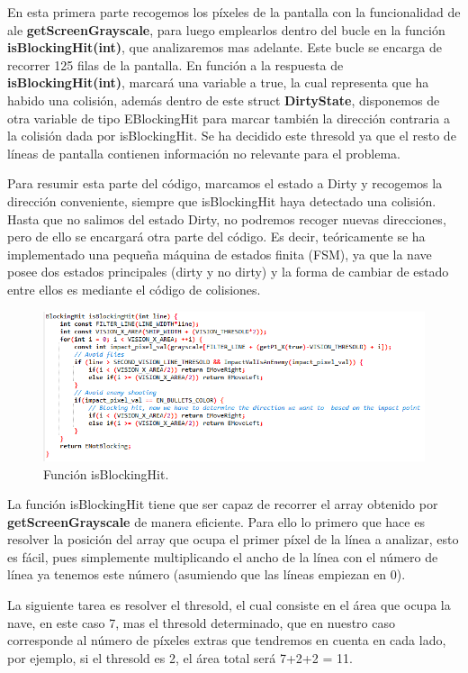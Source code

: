 En esta primera parte recogemos los píxeles de la pantalla con la funcionalidad de \ac{ale} \textbf{getScreenGrayscale}, para luego emplearlos dentro del bucle en la función \textbf{isBlockingHit(int)}, que analizaremos mas adelante. Este bucle se encarga de recorrer 125 filas de la pantalla. En función a la respuesta de \textbf{isBlockingHit(int)}, marcará una variable a true, la cual representa que ha habido una colisión, además dentro de este struct \textbf{DirtyState}, disponemos de otra variable de tipo EBlockingHit para marcar también la dirección contraria a la colisión dada por isBlockingHit. Se ha decidido este thresold ya que el resto de líneas de pantalla contienen información no relevante para el problema.

Para resumir esta parte del código, marcamos el estado a Dirty y recogemos la dirección conveniente, siempre que isBlockingHit haya detectado una colisión. Hasta que no salimos del estado Dirty, no podremos recoger nuevas direcciones, pero de ello se encargará otra parte del código. Es decir, teóricamente se ha implementado una pequeña máquina de estados finita (FSM), ya que la nave posee dos estados principales (dirty y no dirty) y la forma de cambiar de estado entre ellos es mediante el código de colisiones.

\newpage
\begin{figure}[h]
	\centering
	\includegraphics[width=1\textwidth]{Figures/daisblocking}
	\caption{Función isBlockingHit.}
	\label{fig:daisblocking}
\end{figure}

La función isBlockingHit tiene que ser capaz de recorrer el array obtenido por \textbf{getScreenGrayscale} de manera eficiente. Para ello lo primero que hace es resolver la posición del array que ocupa el primer píxel de la línea a analizar, esto es fácil, pues simplemente multiplicando el ancho de la línea con el número de línea ya tenemos este número (asumiendo que las líneas empiezan en 0).

La siguiente tarea es resolver el thresold, el cual consiste en el área que ocupa la nave, en este caso 7, mas el thresold determinado, que en nuestro caso corresponde al número de píxeles extras que tendremos en cuenta en cada lado, por ejemplo, si el thresold es 2, el área total será 7+2+2 = 11.

